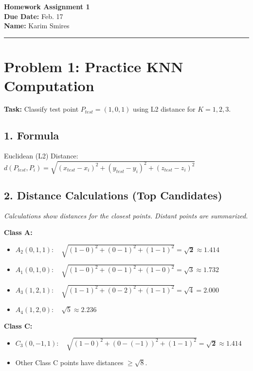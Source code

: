 \documentclass[11pt]{article}
\begin{document}
\begin{center}
  {\Large \textbf{Homework Assignment 1}} \\
  \vspace{0.2cm}
  \textbf{Due Date:} Feb. 17 \\
  \textbf{Name:} Karim Smires
\end{center}
\hrule
\vspace{0.5cm}

\section*{Problem 1: Practice KNN Computation}

\textbf{Task:} Classify test point $P_{test} = (1,0,1)$ using L2 distance for $K=1, 2, 3$.

\subsection*{1. Formula}
Euclidean (L2) Distance: \quad $d(P_{test}, P_i) = \sqrt{(x_{test}-x_i)^2 + (y_{test}-y_i)^2 + (z_{test}-z_i)^2}$

\subsection*{2. Distance Calculations (Top Candidates)}
\textit{Calculations show distances for the closest points. Distant points are summarized.}

\textbf{Class A:}
\begin{itemize}
  \item $A_2(0,1,1): \quad \sqrt{(1-0)^2 + (0-1)^2 + (1-1)^2} = \mathbf{\sqrt{2} \approx 1.414}$
  \item $A_1(0,1,0): \quad \sqrt{(1-0)^2 + (0-1)^2 + (1-0)^2} = \sqrt{3} \approx 1.732$
  \item $A_3(1,2,1): \quad \sqrt{(1-1)^2 + (0-2)^2 + (1-1)^2} = \sqrt{4} = 2.000$
  \item $A_4(1,2,0): \quad \sqrt{5} \approx 2.236$
\end{itemize}

\textbf{Class C:}
\begin{itemize}
  \item $C_3(0,-1,1): \quad \sqrt{(1-0)^2 + (0-(-1))^2 + (1-1)^2} = \mathbf{\sqrt{2} \approx 1.414}$
  \item Other Class C points have distances $\ge \sqrt{8}$.
\end{itemize}
\end{document}
